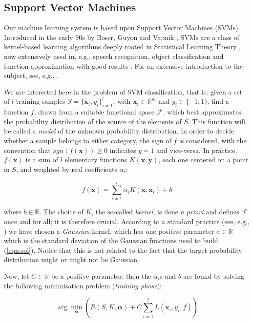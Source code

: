 \documentclass{article}
\def\RR{\mathbb{R}}
\def\xx{\mathbf{x}}
\def\yy{\mathbf{y}}
\def\aa{\boldsymbol{\alpha}}
\begin{document}
\subsection{Support Vector Machines}
\label{subsec:svm}

Our machine learning system is based upon Support Vector Machines
(SVMs). Introduced in the early 90s by Boser, Guyon and Vapnik
\cite{BGV92}, SVMs are a class of kernel-based learning algorithms
deeply rooted in Statistical Learning Theory \cite{v-edbed-82}, now
extensively used in, e.g., speech recognition, object classification
and function approximation with good results \cite{Cristianini00}. For
an extensive introduction to the subject, see, e.g., \cite{Burges98}.

We are interested here in the problem of SVM classification, that is:
given a set of $l$ training samples $S=\{\xx_i,y_i\}_{i=1}^l$, with
$\xx_i \in \RR^m$ and $y_i \in \{-1,1\}$, find a function $f$, drawn
from a suitable functional space $\mathcal{F}$, which best
approximates the probability distribution of the source of the
elements of $S$. This function will be called a \emph{model} of the
unknown probability distribution. In order to decide whether a sample
belongs to either category, the sign of $f$ is considered, with the
convention that $sgn(f(\xx)) \geq 0$ indicates $y = 1$ and
vice-versa. In practice, $f(\xx)$ is a sum of $l$ elementary functions
$K(\xx,\yy)$, each one centered on a point in $S$, and weighted by
real coefficients $\alpha_i$:

\begin{equation} \label{eqn:sol}
  f(\xx) = \sum_{i=1}^l \alpha_i K(\xx,\xx_i) + b
\end{equation}

\noindent where $b \in \RR$. The choice of $K$, the so-called
\emph{kernel}, is done \emph{a priori} and defines $\mathcal{F}$ once
and for all; it is therefore crucial. According to a standard practice
(see, e.g., \cite{Cristianini00}) we have chosen a \emph{Gaussian}
kernel, which has one positive parameter $\sigma \in \RR$ which is the
standard deviation of the Gaussian functions used to build
(\ref{eqn:sol}). Notice that this is not related to the fact that the
target probability distribution might or might not be Gaussian.

Now, let $C \in \RR$ be a positive parameter; then the $\alpha_i$s and
$b$ are found by solving the following minimisation problem
(\emph{training phase}):

\begin{equation} \label{eqn:svm_primal}
  \arg \min_{\aa} \left( R(S,K,\aa) + C \sum_{i=1}^l L(\xx_i,y_i,f) \right)
\end{equation}
\end{document}
